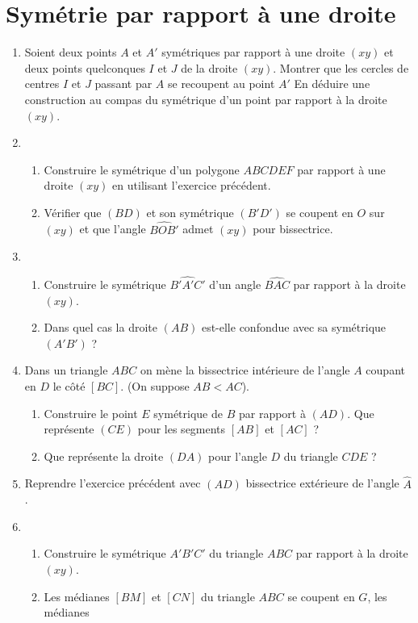 \chapter{Symétrie par rapport à une droite}
\begin{enumerate}
\item Soient deux points $A$ et $A'$ symétriques par rapport à une droite $(xy)$ et 
deux points quelconques $I$ et $J$ de la droite $(xy)$. Montrer que les cercles de
centres $I$ et $J$ passant par $A$ se recoupent au point $A'$ En déduire une construction au compas du symétrique d'un point par rapport à la droite $(xy)$. 
\item \begin{enumerate}
\item Construire le symétrique d'un polygone $ABCDEF$ par rapport à une droite $(xy)$
en utilisant l'exercice précédent. 
\item Vérifier que $(BD)$ et son symétrique $(B'D')$ se coupent en $O$ sur $(xy)$ et
que l'angle $\widehat{BOB'}$ admet $(xy)$ pour bissectrice. 
\end{enumerate}
\item \begin{enumerate}
\item Construire le symétrique $\widehat{B'A'C'}$ d'un angle $\widehat{BAC}$ par rapport à la droite $(xy)$.
\item Dans quel cas la droite $(AB)$ est-elle confondue avec sa symétrique $(A'B')$ ?
\end{enumerate}
\item Dans un triangle $ABC$ on mène la bissectrice intérieure de l'angle $A$ coupant en $D$ le côté $[BC]$. (On suppose $AB<AC$). \begin{enumerate}
\item Construire le point $E$ symétrique de $B$ par rapport à $(AD)$. Que 
représente $(CE)$ pour les segments $[AB]$ et $[AC]$ ? 
\item Que représente la droite $(DA)$ pour l'angle $D$ du triangle $CDE$ ? 
\end{enumerate}
\item Reprendre l'exercice précédent avec $(AD)$ bissectrice extérieure de l'angle $\widehat{A}$. 
\item \begin{enumerate}
\item Construire le symétrique $A'B'C'$ du triangle $ABC$ par rapport à la droite $(xy)$. 
\item Les médianes $[BM]$ et $[CN]$ du triangle $ABC$ se coupent en $G$, les médianes

\end{enumerate}
\end{enumerate}
